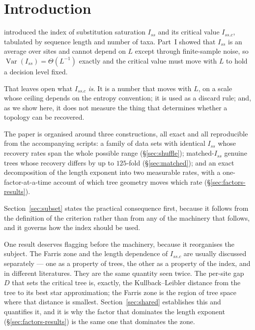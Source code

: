 \documentclass[preprint,12pt,authoryear]{elsarticle}
\newcommand{\Iss}{I_{ss}}
\newcommand{\Issc}{I_{ss.c}}
\newcommand{\Var}{\operatorname{Var}}
\theoremstyle{definition}
\theoremstyle{remark}
\begin{document}
\section{Introduction}

\citet{xia2003iss} introduced the index of substitution saturation $\Iss$
and its critical value $\Issc$, tabulated by sequence length and number of
taxa. Part~I \citep{xu2026preprint} showed that $\Iss$ is an
average over sites and
cannot depend on $L$ except through finite-sample noise, so
$\Var(\Iss)=\Theta(L^{-1})$ exactly and the critical value must move with
$L$ to hold a decision level fixed.

That leaves open what $\Issc$ \emph{is}. It is a number that moves with $L$,
on a scale whose ceiling depends on the entropy convention; it is used as a
discard rule; and, as we show here, it does not measure the thing that
determines whether a topology can be recovered.

The paper is organised around three constructions, all exact and all
reproducible from the accompanying scripts: a family of data sets with
identical $\Iss$ whose recovery rates span the whole possible range
(\S\ref{sec:shuffle}); matched-$\Iss$ genuine trees whose recovery differs by
up to $125$-fold (\S\ref{sec:matched}); and an exact decomposition of the
length exponent into two measurable rates, with a one-factor-at-a-time
account of which tree geometry moves which rate (\S\ref{sec:factors-results}).

Section~\ref{sec:subset} states the practical consequence first, because it
follows from the definition of the criterion rather than from any of the
machinery that follows, and it governs how the index should be used.

One result deserves flagging before the machinery, because it reorganises the
subject. The Farris zone and the length dependence of $\Issc$ are usually
discussed separately --- one as a property of trees, the other as a property
of the index, and in different literatures. They are the same quantity seen
twice. The per-site gap $D$ that sets the critical tree is, exactly, the
Kullback--Leibler distance from the tree to its best star approximation; the
Farris zone is the region of tree space where that distance is smallest.
Section~\ref{sec:shared} establishes this and quantifies it, and it is why
the factor that dominates the length exponent (\S\ref{sec:factors-results}) is the
same one that dominates the zone.
\end{document}
